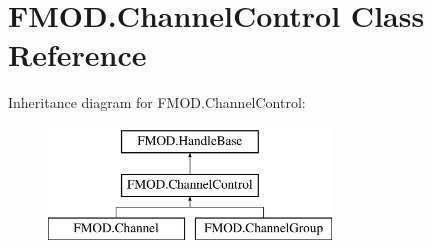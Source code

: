 \hypertarget{class_f_m_o_d_1_1_channel_control}{}\section{F\+M\+O\+D.\+Channel\+Control Class Reference}
\label{class_f_m_o_d_1_1_channel_control}
Inheritance diagram for F\+M\+O\+D.\+Channel\+Control\+:\begin{figure}[H]
\begin{center}
\leavevmode
\includegraphics[height=3.000000cm]{class_f_m_o_d_1_1_channel_control}
\end{center}
\end{figure}
